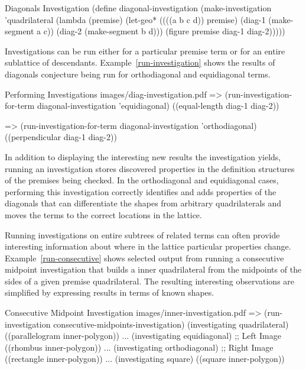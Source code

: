 \begin{code-example}
[label=diag-investigation]
{Diagonals Investigation}
(define diagonal-investigation
  (make-investigation
   'quadrilateral
   (lambda (premise)
     (let-geo*
         ((((a b c d)) premise)
          (diag-1 (make-segment a c))
          (diag-2 (make-segment b d)))
       (figure premise diag-1 diag-2)))))
\end{code-example}

Investigations can be run either for a particular premise term or for
an entire sublattice of descendants. Example~\ref{run-investigation}
shows the results of diagonals conjecture being run for orthodiagonal
and equidiagonal terms.

\begin{pdf-example}
[label=run-investigation]
{Performing Investigations}
{images/diag-investigation.pdf}
=> (run-investigation-for-term diagonal-investigation 'equidiagonal)
((equal-length diag-1 diag-2))

=> (run-investigation-for-term diagonal-investigation 'orthodiagonal)
((perpendicular diag-1 diag-2))
\end{pdf-example}

In addition to displaying the interesting new results the
investigation yields, running an investigation stores discovered
properties in the definition structures of the premises being
checked. In the orthodiagonal and equidiagonal cases, performing this
investigation correctly identifies and adds properties of the
diagonals that can differentiate the shapes from arbitrary
quadrilaterals and moves the terms to the correct locations in the
lattice.

Running investigations on entire subtrees of related terms can often
provide interesting information about where in the lattice particular
properties change. Example~\ref{run-consecutive} shows selected output
from running a consecutive midpoint investigation that builds a inner
quadrilateral from the midpoints of the sides of a given premise
quadrilateral. The resulting interesting observations are simplified
by expressing results in terms of known shapes.

\begin{pdf-example}
[label=run-consecutive,
comment style={frame hidden,
opacityback=0,
height=5.6cm,
raster columns=2,graphics pages={1,2}}]
{Consecutive Midpoint Investigation \protect{}}
{images/inner-investigation.pdf}
=> (run-investigation consecutive-midpoints-investigation)
(investigating quadrilateral)
   ((parallelogram inner-polygon))
...
(investigating equidiagonal)   ;; Left Image
   ((rhombus inner-polygon))
...
(investigating orthodiagonal)  ;; Right Image
   ((rectangle inner-polygon))
...
(investigating square)
   ((square inner-polygon))
\end{pdf-example}

